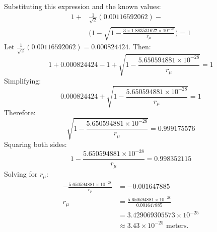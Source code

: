 \documentclass[%
 reprint,
 amsmath,amssymb,
 aps,
]{revtex4-1}
\numberwithin{equation}{section}%
\begin{document}
\noindent Substituting this expression and the known values:
\begin{equation}
\begin{aligned}
1 + & \frac{1}{\sqrt{2}}(0.00116592062) - \\
& \biggl(1 - \sqrt{1 - \frac{3 \times 1.883531627 \times 10^{-28}}{r_{\mu}}}\biggr) = 1
\end{aligned}
\label{eq:full_equation_corrected}
\end{equation}
Let $\frac{1}{\sqrt{2}}(0.00116592062) = 0.000824424$. Then:
\begin{equation}
   1 + 0.000824424 - 1 + \sqrt{1 - \frac{5.650594881 \times 10^{-28}}{r_{\mu}}} = 1
\label{eq:simplified_equation_corrected}
\end{equation}
Simplifying:
\begin{equation}
   0.000824424 + \sqrt{1 - \frac{5.650594881 \times 10^{-28}}{r_{\mu}}} = 1
\label{eq:further_simplified}
\end{equation}
Therefore:
\begin{equation}
   \sqrt{1 - \frac{5.650594881 \times 10^{-28}}{r_{\mu}}} = 0.999175576
\label{eq:sqrt_equation_corrected}
\end{equation}
Squaring both sides:
\begin{equation}
   1 - \frac{5.650594881 \times 10^{-28}}{r_{\mu}} = 0.998352115
\label{eq:squared_equation_corrected}
\end{equation}
Solving for $r_{\mu}$:
\begin{equation}
   \begin{split}
       -\frac{5.650594881 \times 10^{-28}}{r_{\mu}} &= -0.001647885\\
       r_{\mu} &= \frac{5.650594881 \times 10^{-28}}{0.001647885}\\
       &= 3.429069305573 \times 10^{-25}\\
       &\approx 3.43 \times 10^{-25} \text{ meters}.
   \end{split}
\label{eq:final_radius_corrected}
\end{equation}
\end{document}
